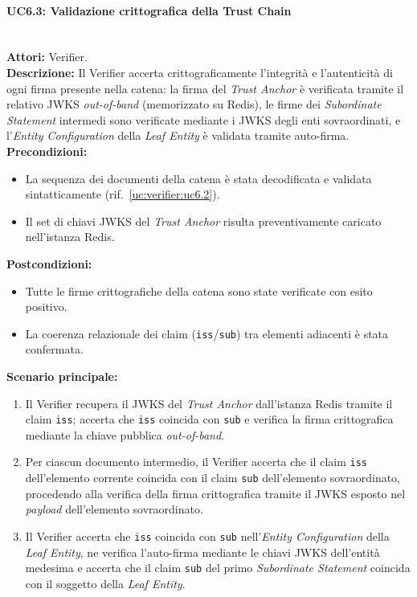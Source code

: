 \paragraph{\large\bfseries UC6.3: Validazione crittografica della Trust Chain}
\label{uc:verifier:uc6.3}
\mbox{}\\
\noindent\textbf{Attori:} Verifier.
\\
\noindent\textbf{Descrizione:} Il Verifier accerta crittograficamente l'integrità e l'autenticità di ogni firma presente nella catena: la firma del \textit{Trust Anchor} è verificata tramite il relativo JWKS \textit{out-of-band} (memorizzato su Redis), le firme dei \textit{Subordinate Statement} intermedi sono verificate mediante i JWKS degli enti sovraordinati, e l'\textit{Entity Configuration} della \textit{Leaf Entity} è validata tramite auto-firma.
\\
\noindent\textbf{Precondizioni:}
\begin{itemize}
    \item La sequenza dei documenti della catena è stata decodificata e validata sintatticamente (rif.\ \ref{uc:verifier:uc6.2}).
    \item Il set di chiavi JWKS del \textit{Trust Anchor} risulta preventivamente caricato nell'istanza Redis.
\end{itemize}
\noindent\textbf{Postcondizioni:}
\begin{itemize}
    \item Tutte le firme crittografiche della catena sono state verificate con esito positivo.
    \item La coerenza relazionale dei claim (\texttt{iss}/\texttt{sub}) tra elementi adiacenti è stata confermata.
\end{itemize}

\noindent\textbf{Scenario principale:}
\begin{enumerate}
    \item Il Verifier recupera il JWKS del \textit{Trust Anchor} dall'istanza Redis tramite il claim \texttt{iss}; accerta che \texttt{iss} coincida con \texttt{sub} e verifica la firma crittografica mediante la chiave pubblica \textit{out-of-band}.
    \item Per ciascun documento intermedio, il Verifier accerta che il claim \texttt{iss} dell'elemento corrente coincida con il claim \texttt{sub} dell'elemento sovraordinato, procedendo alla verifica della firma crittografica tramite il JWKS esposto nel \textit{payload} dell'elemento sovraordinato.
    \item Il Verifier accerta che \texttt{iss} coincida con \texttt{sub} nell'\textit{Entity Configuration} della \textit{Leaf Entity}, ne verifica l'auto-firma mediante le chiavi JWKS dell'entità medesima e accerta che il claim \texttt{sub} del primo \textit{Subordinate Statement} coincida con il soggetto della \textit{Leaf Entity}.
\end{enumerate}


